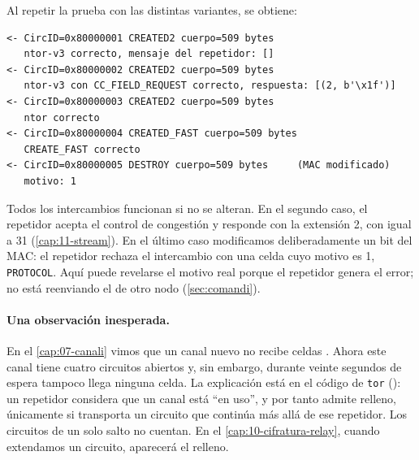 Al repetir la prueba con las distintas variantes, se obtiene:

\begin{lstlisting}[numbers=none]
<- CircID=0x80000001 CREATED2 cuerpo=509 bytes
   ntor-v3 correcto, mensaje del repetidor: []
<- CircID=0x80000002 CREATED2 cuerpo=509 bytes
   ntor-v3 con CC_FIELD_REQUEST correcto, respuesta: [(2, b'\x1f')]
<- CircID=0x80000003 CREATED2 cuerpo=509 bytes
   ntor correcto
<- CircID=0x80000004 CREATED_FAST cuerpo=509 bytes
   CREATE_FAST correcto
<- CircID=0x80000005 DESTROY cuerpo=509 bytes     (MAC modificado)
   motivo: 1
\end{lstlisting}

Todos los intercambios funcionan si no se alteran. En el segundo caso, el repetidor acepta el control de congestión y responde con la extensión 2, con  igual a 31 (\cref{cap:11-stream}). En el último caso modificamos deliberadamente un bit del MAC: el repetidor rechaza el intercambio con una celda  cuyo motivo es 1, \texttt{PROTOCOL}. Aquí puede revelarse el motivo real porque el repetidor genera el error; no está reenviando el  de otro nodo (\cref{sec:comandi}).

\paragraph{Una observación inesperada.} En el \cref{cap:07-canali} vimos que un canal nuevo no recibe celdas . Ahora este canal tiene cuatro circuitos abiertos y, sin embargo, durante veinte segundos de espera tampoco llega ninguna celda. La explicación está en el código de \texttt{tor} (): un repetidor considera que un canal está \enquote{en uso}, y por tanto admite relleno, únicamente si transporta un circuito que continúa más allá de ese repetidor. Los circuitos de un solo salto no cuentan. En el \cref{cap:10-cifratura-relay}, cuando extendamos un circuito, aparecerá el relleno.

